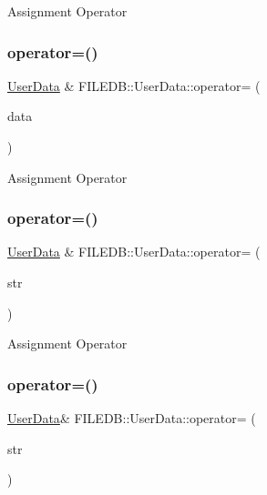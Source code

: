 Assignment Operator \mbox{\label{classFILEDB_1_1UserData_a76e926353b2019d6b5a6333d3cc4c5b4}} 
\subsubsection{\texorpdfstring{operator=()}{operator=()}\hspace{0.1cm}{\footnotesize\ttfamily [2/4]}}
{\footnotesize\ttfamily \mbox{\hyperlink{classFILEDB_1_1UserData}{User\+Data}} \& F\+I\+L\+E\+D\+B\+::\+User\+Data\+::operator= (\begin{DoxyParamCaption}\item[{const \mbox{\hyperlink{classFILEDB_1_1UserData}{User\+Data}} \&}]{data }\end{DoxyParamCaption})}

Assignment Operator \mbox{\label{classFILEDB_1_1UserData_ad8582ecfcd84204c1fa83d050cd2d8bd}} 
\subsubsection{\texorpdfstring{operator=()}{operator=()}\hspace{0.1cm}{\footnotesize\ttfamily [3/4]}}
{\footnotesize\ttfamily \mbox{\hyperlink{classFILEDB_1_1UserData}{User\+Data}} \& F\+I\+L\+E\+D\+B\+::\+User\+Data\+::operator= (\begin{DoxyParamCaption}\item[{const std\+::string \&}]{str }\end{DoxyParamCaption})}

Assignment Operator \mbox{\label{classFILEDB_1_1UserData_ab41f011c29fc6e394dbb1b960c7947b0}} 
\subsubsection{\texorpdfstring{operator=()}{operator=()}\hspace{0.1cm}{\footnotesize\ttfamily [4/4]}}
{\footnotesize\ttfamily \mbox{\hyperlink{classFILEDB_1_1UserData}{User\+Data}}\& F\+I\+L\+E\+D\+B\+::\+User\+Data\+::operator= (\begin{DoxyParamCaption}\item[{const std\+::string \&}]{str }\end{DoxyParamCaption})}

